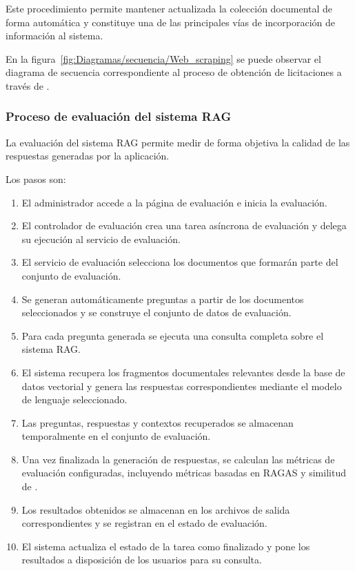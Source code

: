 Este procedimiento permite mantener actualizada la colección documental de forma automática y constituye una de las principales vías de incorporación de información al sistema. 

En la figura~\ref{fig:Diagramas/secuencia/Web_scraping} se puede observar el diagrama de secuencia correspondiente al proceso de obtención de licitaciones a través de .


\subsubsection{Proceso de evaluación del sistema RAG}

La evaluación del sistema RAG permite medir de forma objetiva la calidad de las respuestas generadas por la aplicación. 

Los pasos son:
\begin{enumerate}
	\item El administrador accede a la página de evaluación e inicia la evaluación.
	\item El controlador de evaluación crea una tarea asíncrona de evaluación y delega su ejecución al servicio de evaluación.
	\item El servicio de evaluación selecciona los documentos que formarán parte del conjunto de evaluación.
	\item Se generan automáticamente preguntas a partir de los documentos seleccionados y se construye el conjunto de datos de evaluación.
	\item Para cada pregunta generada se ejecuta una consulta completa sobre el sistema RAG.
	\item El sistema recupera los fragmentos documentales relevantes desde la base de datos vectorial y genera las respuestas correspondientes mediante el modelo de lenguaje seleccionado.
	\item Las preguntas, respuestas y contextos recuperados se almacenan temporalmente en el conjunto de evaluación.
	\item Una vez finalizada la generación de respuestas, se calculan las métricas de evaluación configuradas, incluyendo métricas basadas en RAGAS y similitud de .
	\item Los resultados obtenidos se almacenan en los archivos de salida correspondientes y se registran en el estado de evaluación.
	\item El sistema actualiza el estado de la tarea como finalizado y pone los resultados a disposición de los usuarios para su consulta.
\end{enumerate}

